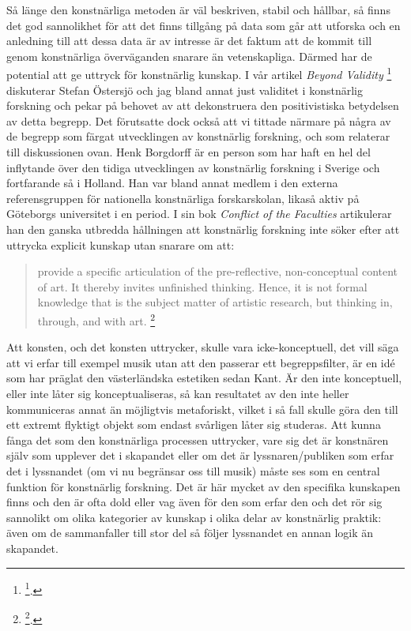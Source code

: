 \documentclass[11pt]{article}
\begin{document}
Så länge den konstnärliga metoden är väl beskriven, stabil och hållbar,
så finns det god sannolikhet för att det finns tillgång på data som går
att utforska och en anledning till att dessa data är av intresse är det
faktum att de kommit till genom konstnärliga överväganden snarare än
vetenskapliga. Därmed har de potential att ge uttryck för konstnärlig
kunskap. I vår artikel \emph{Beyond Validity} \footnote{\footcite{frisk-ost13}.} diskuterar Stefan
Östersjö och jag bland annat just validitet i konstnärlig forskning och
pekar på behovet av att dekonstruera den positivistiska betydelsen av
detta begrepp. Det förutsatte dock också att vi tittade närmare på några
av de begrepp som färgat utvecklingen av konstnärlig forskning, och som
relaterar till diskussionen ovan. Henk Borgdorff är en person som har
haft en hel del inflytande över den tidiga utvecklingen av konstnärlig
forskning i Sverige och fortfarande så i Holland. Han var bland annat
medlem i den externa referensgruppen för nationella konstnärliga
forskarskolan, likaså aktiv på Göteborgs universitet i en period. I sin
bok \emph{Conflict of the Faculties} artikulerar han den ganska utbredda
hållningen att konstnärlig forskning inte söker efter att uttrycka
explicit kunskap utan snarare om att:

\begin{quote}
provide a specific articulation of the pre-reflective, non-conceptual
content of art. It thereby invites unfinished thinking. Hence, it is
not formal knowledge that is the subject matter of artistic research,
but thinking in, through, and with art. \footnote{\footcite[s.143]{borgdorff2012}.}
\end{quote}

Att konsten, och det konsten uttrycker, skulle vara icke-konceptuell,
det vill säga att vi erfar till exempel musik utan att den passerar ett
begreppsfilter, är en idé som har präglat den västerländska estetiken
sedan Kant. Är den inte konceptuell, eller inte låter sig
konceptualiseras, så kan resultatet av den inte heller kommuniceras
annat än möjligtvis metaforiskt, vilket i så fall skulle göra den till
ett extremt flyktigt objekt som endast svårligen låter sig studeras. Att
kunna fånga det som den konstnärliga processen uttrycker, vare sig det
är konstnären själv som upplever det i skapandet eller om det är
lyssnaren/publiken som erfar det i lyssnandet (om vi nu begränsar oss
till musik) måste ses som en central funktion för konstnärlig forskning.
Det är här mycket av den specifika kunskapen finns och den är ofta dold
eller vag även för den som erfar den och det rör sig sannolikt om olika
kategorier av kunskap i olika delar av konstnärlig praktik: även om de
sammanfaller till stor del så följer lyssnandet en annan logik än
skapandet.
\end{document}
